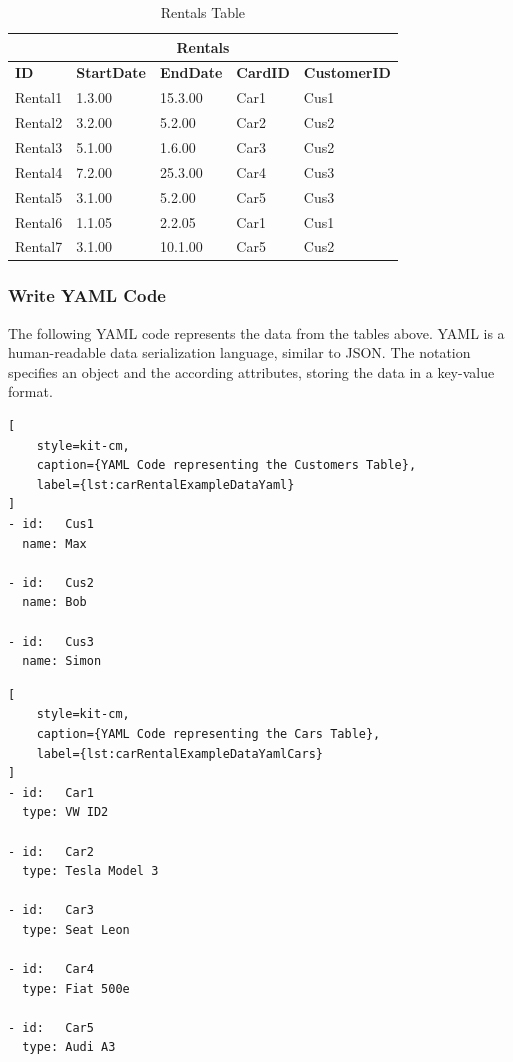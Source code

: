 \begin{table}[H]
    \centering
    \caption{Rentals Table}    
    \label{tab:carRentalExampleDataRentals}
    \begin{tabular}{|p{2cm}|p{2cm}|p{2cm}|p{2cm}|p{3cm}|}
        \hline
        \multicolumn{5}{|c|}{\textbf{Rentals}} \\
        \hline
        \textbf{ID} & \textbf{StartDate} & \textbf{EndDate} & \textbf{CardID} & \textbf{CustomerID} \\        
        \hline
        Rental1 & 1.3.00 & 15.3.00 & Car1 & Cus1 \\
        Rental2 & 3.2.00 & 5.2.00 & Car2 & Cus2 \\
        Rental3 & 5.1.00 & 1.6.00 & Car3 & Cus2 \\
        Rental4 & 7.2.00 & 25.3.00 & Car4 & Cus3 \\
        Rental5 & 3.1.00 & 5.2.00 & Car5 & Cus3 \\
        Rental6 & 1.1.05 & 2.2.05 & Car1 & Cus1 \\
        Rental7 & 3.1.00 & 10.1.00 & Car5 & Cus2 \\
        \hline
    \end{tabular}
\end{table}

\subsubsection*{Write YAML Code}
The following YAML code represents the data from the tables above.
YAML is a human-readable data serialization language, similar to JSON.
The notation specifies an object and the according attributes, storing the data in a key-value format.

\begin{lstlisting}[
    style=kit-cm,
    caption={YAML Code representing the Customers Table},
    label={lst:carRentalExampleDataYaml}
]
- id:   Cus1
  name: Max

- id:   Cus2
  name: Bob

- id:   Cus3
  name: Simon
\end{lstlisting}

\begin{lstlisting}[
    style=kit-cm,
    caption={YAML Code representing the Cars Table},
    label={lst:carRentalExampleDataYamlCars}
]
- id:   Car1
  type: VW ID2

- id:   Car2
  type: Tesla Model 3

- id:   Car3
  type: Seat Leon

- id:   Car4
  type: Fiat 500e

- id:   Car5
  type: Audi A3
\end{lstlisting}

